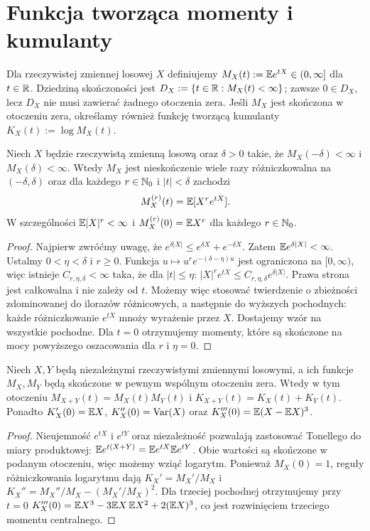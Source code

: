\section{Funkcja tworząca momenty i kumulanty}

\begin{definicja}
Dla rzeczywistej zmiennej losowej $X$ definiujemy
$M_X(t):=\mathbb{E} e^{tX}\in(0,\infty]$ dla $t\in\mathbb{R}$.
Dziedziną skończoności jest $D_X:=\{t\in\mathbb{R}:M_X(t)<\infty\}$;
zawsze $0\in D_X$, lecz $D_X$ nie musi zawierać
żadnego otoczenia zera. Jeśli $M_X$ jest skończona
w otoczeniu zera, określamy również funkcję tworzącą
kumulanty $K_X(t):=\log M_X(t)$.
\end{definicja}

\begin{twierdzenie}
Niech $X$ będzie rzeczywistą zmienną losową oraz
$\delta>0$ takie, że $M_X(-\delta)<\infty$ i
$M_X(\delta)<\infty$. Wtedy $M_X$ jest nieskończenie
wiele razy różniczkowalna na $(-\delta,\delta)$ oraz
dla każdego $r\in\mathbb{N}_0$ i $|t|<\delta$ zachodzi
\[
M_X^{(r)}(t)=\mathbb{E}[X^r e^{tX}].
\]
W szczególności $\mathbb{E}|X|^r<\infty$ i
$M_X^{(r)}(0)=\mathbb{E} X^r$ dla każdego $r\in\mathbb{N}_0$.
\end{twierdzenie}
\begin{proof}
Najpierw zwróćmy uwagę, że
$e^{\delta|X|}\leq e^{\delta X}+e^{-\delta X}$.
Zatem $\mathbb{E} e^{\delta|X|}<\infty$.
Ustalmy $0<\eta<\delta$ i $r\geq0$. Funkcja
$u\mapsto u^re^{-(\delta-\eta)u}$ jest ograniczona na
$[0,\infty)$, więc istnieje $C_{r,\eta,\delta}<\infty$
taka, że dla $|t|\leq\eta$:
$|X|^re^{tX}\leq C_{r,\eta,\delta}e^{\delta|X|}$.
Prawa strona jest całkowalna i nie zależy od $t$.
Możemy więc stosować twierdzenie o zbieżności zdominowanej
do ilorazów różnicowych, a następnie do wyższych pochodnych:
każde różniczkowanie $e^{tX}$ mnoży wyrażenie przez $X$.
Dostajemy wzór na wszystkie pochodne. Dla $t=0$
otrzymujemy momenty, które są skończone na mocy
powyższego oszacowania dla $r$ i $\eta=0$.
\end{proof}

\begin{twierdzenie}
Niech $X,Y$ będą niezależnymi rzeczywistymi zmiennymi losowymi,
a ich funkcje $M_X,M_Y$ będą skończone w pewnym wspólnym
otoczeniu zera. Wtedy w tym otoczeniu
$M_{X+Y}(t)=M_X(t)M_Y(t)$ i
$K_{X+Y}(t)=K_X(t)+K_Y(t)$.
Ponadto $K_X'(0)=\mathbb{E} X$, $K_X''(0)=\operatorname{Var}(X)$
oraz $K_X'''(0)=\mathbb{E}(X-\mathbb{E} X)^3$.
\end{twierdzenie}
\begin{proof}
Nieujemność $e^{tX}$ i $e^{tY}$ oraz niezależność pozwalają
zastosować Tonellego do miary produktowej:
$\mathbb{E} e^{t(X+Y)}=\mathbb{E} e^{tX}\mathbb{E} e^{tY}$.
Obie wartości są skończone w podanym otoczeniu, więc
możemy wziąć logarytm. Ponieważ $M_X(0)=1$, reguły
różniczkowania logarytmu dają
$K_X'=M_X'/M_X$ i
$K_X''=M_X''/M_X-(M_X'/M_X)^2$.
Dla trzeciej pochodnej otrzymujemy przy $t=0$
$K_X'''(0)=\mathbb{E} X^3-3\mathbb{E} X\,\mathbb{E} X^2+2(\mathbb{E} X)^3$,
co jest rozwinięciem trzeciego momentu centralnego.
\end{proof}

